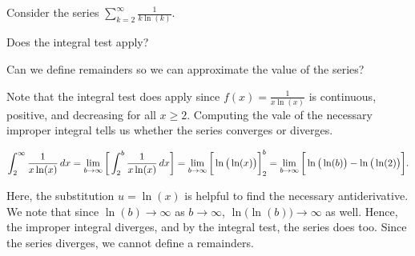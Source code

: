 \documentclass{ximera}
\author{Jim Talamo}
\begin{document}
\begin{exercise}

Consider the series $\sum_{k=2}^{\infty} \frac{1}{k \ln(k)}$.  

Does the integral test apply?

\begin{multipleChoice}
\end{multipleChoice}

Can we define remainders so we can approximate the value of the series?

\begin{multipleChoice}
\end{multipleChoice}

\begin{feedback}
Note that the integral test does apply since $f(x) =\frac{1}{x \ln(x)}$ is continuous, positive, and decreasing for all $x \geq 2$.  Computing the vale of the necessary improper integral tells us whether the series converges or diverges.

\[
\int_2^\infty  \frac{1}{x \ln(x)} \d x = \lim_{b \to \infty} \eval{\int_2^b  \frac{1}{x \ln(x)} \d x} = \lim_{b \to \infty} \eval{\ln\big(\ln(x)\big)}_2^b = \lim_{b \to \infty} \eval{\ln\big(\ln(b)\big) - \ln\big(\ln(2)\big) }.
\]

Here, the substitution $u=\ln(x)$ is helpful to find the necessary antiderivative. We note that since $\ln(b) \rightarrow \infty$ as $b \rightarrow \infty$, $\ln\big(\ln(b)\big) \rightarrow \infty$ as well.   Hence, the improper integral diverges, and by the integral test, the series does too.  Since the series diverges, we cannot define a remainders. 
\end{feedback}

\end{exercise}
\end{document}
